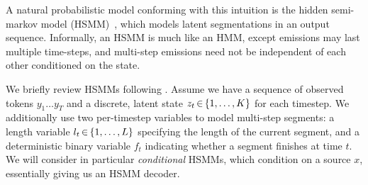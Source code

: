 \documentclass[11pt,a4paper]{article}
\begin{document}
A natural probabilistic model conforming with this intuition is the hidden semi-markov model (HSMM)~\citep{gales1993theory,ostendorf1996hmm}, which models latent segmentations in an output sequence. %
Informally, an HSMM is much like an HMM, except emissions may last multiple time-steps, and multi-step emissions need not be independent of each other conditioned on the state. 

We briefly review HSMMs following \citet{murphy2002hidden}. Assume we have a sequence of observed tokens $y_{1} \ldots y_{T}$ and a discrete, latent state $z_t \, {\in} \, \{1,\ldots,K\}$ for each timestep. We additionally use two per-timestep variables to model multi-step segments: a length variable $l_t \, {\in} \, \{1,\ldots, L\}$ specifying the length of the current segment, and a deterministic binary variable $f_t$ indicating whether a segment finishes at time $t$. We will consider in particular \textit{conditional} HSMMs, which condition on a source $x$, essentially giving us an HSMM decoder.






\end{document}
